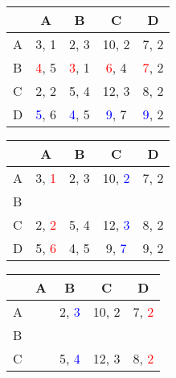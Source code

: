 \documentclass[12pt]{report}
\begin{document}
\begin{flushleft}
\begin{figure}[!htb]
    \begin{minipage}{0.45\textwidth}
        \centering
        \begin{tabular}{p{0.3cm}|c|c|c|c|}
            & A & B & C & D \\
            \hline
            A & 3, 1 & 2, 3 & 10, 2 & 7, 2 \\
            \hline
            B & \textcolor{red}{4}, 5 & \textcolor{red}{3}, 1 & 
            \textcolor{red}{6}, 4 & \textcolor{red}{7}, 2 \\
            \hline
            C & 2, 2 & 5, 4 & 12, 3 & 8, 2 \\
            \hline
            D & \textcolor{blue}{5}, 6 & \textcolor{blue}{4}, 5 & 
            \textcolor{blue}{9}, 7 & \textcolor{blue}{9}, 2 \\
            \hline
        \end{tabular}
    \end{minipage}
    \begin{minipage}{0.5\textwidth}
        \centering
        \begin{tabular}{p{0.3cm}|c|c|c|c|}
            & A & B & C & D \\
            \hline
            A & 3, \textcolor{red}{1} & 2, 3 & 10, 
            \textcolor{blue}{2} & 7, 2 \\
            \hline
            B & & & & \\
            \hline
            C & 2, \textcolor{red}{2} & 5, 4 & 12, 
            \textcolor{blue}{3} & 8, 2 \\
            \hline
            D & 5, \textcolor{red}{6} & 4, 5 & 9, 
            \textcolor{blue}{7} & 9, 2 \\
            \hline
        \end{tabular}
    \end{minipage}
\end{figure}
\begin{figure}[!htb]
    \begin{minipage}{0.45\textwidth}
        \centering
        \begin{tabular}{p{0.3cm}|c|c|c|c|}
            & A & B & C & D \\
            \hline
            A & & 2, \textcolor{blue}{3} & 10, 2 & 7, \textcolor{red}{2} \\
            \hline
            B & & & & \\
            \hline
            C & & 5, \textcolor{blue}{4} & 12, 3 & 8, \textcolor{red}{2} \\

\end{tabular}
\end{minipage}
\end{figure}
\end{flushleft}
\end{document}
